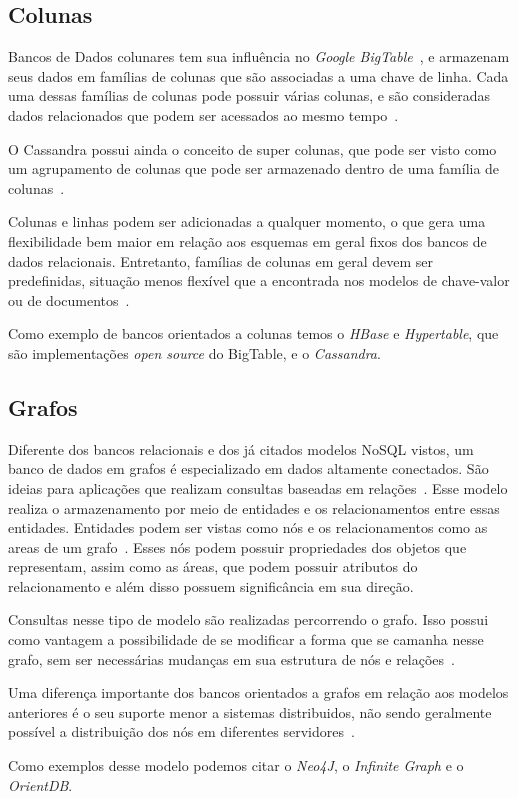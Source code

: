 \subsection*{Colunas}
Bancos de Dados colunares tem sua influência no \emph{Google BigTable}~\cite{bigtable}, e armazenam seus dados em famílias de colunas que são associadas a uma chave de linha. Cada uma dessas famílias de colunas pode possuir várias colunas, e são consideradas dados relacionados que podem ser acessados ao mesmo tempo~\cite{pramod}. 

O Cassandra possui ainda o conceito de super colunas, que pode ser visto como um agrupamento de colunas que pode ser armazenado dentro de uma família de colunas~\cite{pramod}.

Colunas e linhas podem ser adicionadas a qualquer momento, o que gera uma flexibilidade bem maior em relação aos esquemas em geral fixos dos bancos de dados relacionais.  Entretanto, famílias de colunas em geral devem ser predefinidas, situação menos flexível que a encontrada nos modelos de chave-valor ou de documentos~\cite{nosqleval}.  

Como exemplo de bancos orientados a colunas temos o \emph{HBase} e \emph{Hypertable}, que são implementações \emph{open source} do BigTable, e o \emph{Cassandra}.


\subsection*{Grafos}
Diferente dos bancos relacionais e dos já citados modelos NoSQL vistos, um banco de dados em grafos é especializado em dados altamente conectados. São ideias para aplicações que realizam consultas baseadas em relações~\cite{nosqleval}.
Esse modelo realiza o armazenamento por meio de entidades e os relacionamentos entre essas entidades. Entidades podem ser vistas como nós e os relacionamentos como as areas de um grafo~\cite{pramod}. Esses nós podem possuir propriedades dos objetos que representam, assim como as áreas, que podem possuir atributos do relacionamento e além disso possuem significância em sua direção.

Consultas nesse tipo de modelo são realizadas percorrendo o grafo. Isso possui como vantagem a possibilidade de se modificar a forma que se camanha nesse grafo, sem ser necessárias mudanças em sua estrutura de nós e relações~\cite{pramod}.

Uma diferença importante dos bancos orientados a grafos em relação aos modelos anteriores é o seu suporte menor a sistemas distribuidos, não sendo geralmente possível a distribuição dos nós em diferentes servidores~\cite{pramod}.

Como exemplos desse modelo podemos citar o \emph{Neo4J}, o \emph{Infinite Graph} e o \emph{OrientDB}.